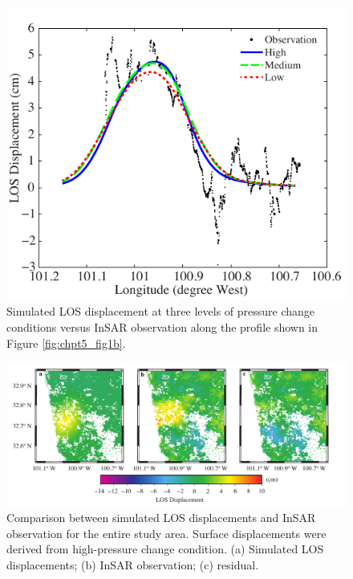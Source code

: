 \clearpage
\begin{figure}
	\centering
	\includegraphics{figs_paper3/Fig10.pdf}	
	\caption{Simulated LOS displacement at three levels of pressure change conditions versus InSAR observation along the profile shown in Figure \ref{fig:chpt5_fig1b}.}
	\label{fig:chpt5_fig10}
\end{figure}

\clearpage
\begin{figure}
	\centering
	\includegraphics[width=\textwidth]{figs_paper3/Fig11.pdf}	
	\caption[Comparison between simulated LOS displacements and InSAR observation for the entire study area.]{Comparison between simulated LOS displacements and InSAR observation for the entire study area.  Surface displacements were derived from high-pressure change condition.  (a) Simulated LOS displacements; (b) InSAR observation; (c) residual.}
	\label{fig:chpt5_fig11}
\end{figure}
% 
